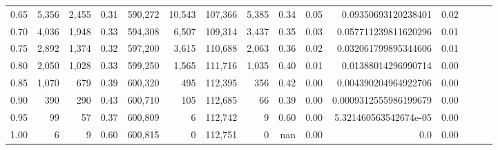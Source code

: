 \begin{tabular}{rrrrrrrrrrrrrrr}
0.65 &   5,356 &   2,455 &  0.31 &  590,272 &   10,543 &  107,366 &    5,385 &  0.34 &  0.05 &    0.09350693120238401 &      0.02 \\
0.70 &   4,036 &   1,948 &  0.33 &  594,308 &    6,507 &  109,314 &    3,437 &  0.35 &  0.03 &   0.057711239811620296 &      0.01 \\
0.75 &   2,892 &   1,374 &  0.32 &  597,200 &    3,615 &  110,688 &    2,063 &  0.36 &  0.02 &   0.032061799895344606 &      0.01 \\
0.80 &   2,050 &   1,028 &  0.33 &  599,250 &    1,565 &  111,716 &    1,035 &  0.40 &  0.01 &    0.01388014296990714 &      0.00 \\
0.85 &   1,070 &     679 &  0.39 &  600,320 &      495 &  112,395 &      356 &  0.42 &  0.00 &   0.004390204964922706 &      0.00 \\
0.90 &     390 &     290 &  0.43 &  600,710 &      105 &  112,685 &       66 &  0.39 &  0.00 &  0.0009312555986199679 &      0.00 \\
0.95 &      99 &      57 &  0.37 &  600,809 &        6 &  112,742 &        9 &  0.60 &  0.00 &  5.321460563542674e-05 &      0.00 \\
1.00 &       6 &       9 &  0.60 &  600,815 &        0 &  112,751 &        0 &   nan &  0.00 &                    0.0 &      0.00 \\
\bottomrule
\end{tabular}
